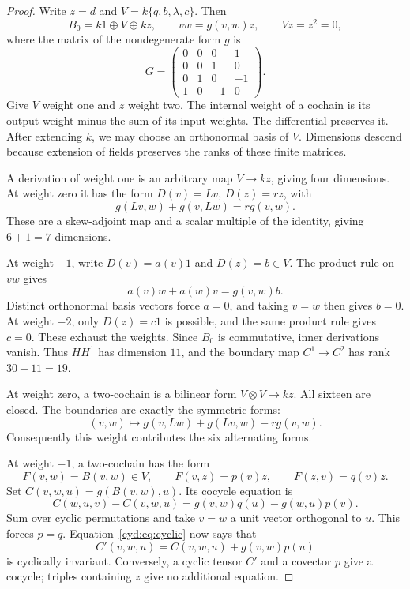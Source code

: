 \begin{proof}
Write \(z=d\) and \(V=k\{q,b,\lambda,c\}\). Then
\[
 B_0=k1\oplus V\oplus kz,\qquad
 vw=g(v,w)z,\qquad Vz=z^2=0,
\]
where the matrix of the nondegenerate form \(g\) is
\begin{equation}\label{cyd:eq:form}
 G=\begin{pmatrix}
 0&0&0&1\\0&0&1&0\\0&1&0&-1\\1&0&-1&0
 \end{pmatrix}.
\end{equation}
Give \(V\) weight one and \(z\) weight two.
The internal weight of a cochain is its output weight minus
the sum of its input weights. The differential preserves it.
After extending \(k\), we may choose an orthonormal basis of
\(V\). Dimensions descend because extension of fields
preserves the ranks of these finite matrices.

A derivation of weight one is an arbitrary map \(V\to kz\),
giving four dimensions. At weight zero it has the form
\(D(v)=Lv\), \(D(z)=rz\), with
\[
               g(Lv,w)+g(v,Lw)=r g(v,w).
\]
These are a skew-adjoint map and a scalar multiple of the
identity, giving \(6+1=7\) dimensions.

At weight \(-1\), write \(D(v)=a(v)1\) and \(D(z)=b\in V\).
The product rule on \(vw\) gives
\[
                 a(v)w+a(w)v=g(v,w)b.
\]
Distinct orthonormal basis vectors force \(a=0\), and taking
\(v=w\) then gives \(b=0\).
At weight \(-2\), only \(D(z)=c1\) is possible, and the
same product rule gives \(c=0\). These exhaust the weights.
Since \(B_0\) is commutative, inner derivations vanish.
Thus \(HH^1\) has dimension \(11\), and the boundary map
\(C^1\to C^2\) has rank \(30-11=19\).

At weight zero, a two-cochain is a bilinear form
\(V\otimes V\to kz\). All sixteen are closed.
The boundaries are exactly the symmetric forms:
\[
       (v,w)\longmapsto g(v,Lw)+g(Lv,w)-r g(v,w).
\]
Consequently this weight contributes the six alternating forms.

At weight \(-1\), a two-cochain has the form
\[
 F(v,w)=B(v,w)\in V,\qquad
 F(v,z)=p(v)z,\qquad F(z,v)=q(v)z.
\]
Set \(C(v,w,u)=g(B(v,w),u)\). Its cocycle equation is
\begin{equation}\label{cyd:eq:cyclic}
 C(w,u,v)-C(v,w,u)
      =g(v,w)q(u)-g(w,u)p(v).
\end{equation}
Sum over cyclic permutations and take \(v=w\) a unit vector
orthogonal to \(u\). This forces \(p=q\).
Equation~\eqref{cyd:eq:cyclic} now says that
\[
                  C'(v,w,u)=C(v,w,u)+g(v,w)p(u)
\]
is cyclically invariant. Conversely, a cyclic tensor \(C'\)
and a covector \(p\) give a cocycle; triples containing \(z\)
give no additional equation.


\end{proof}
